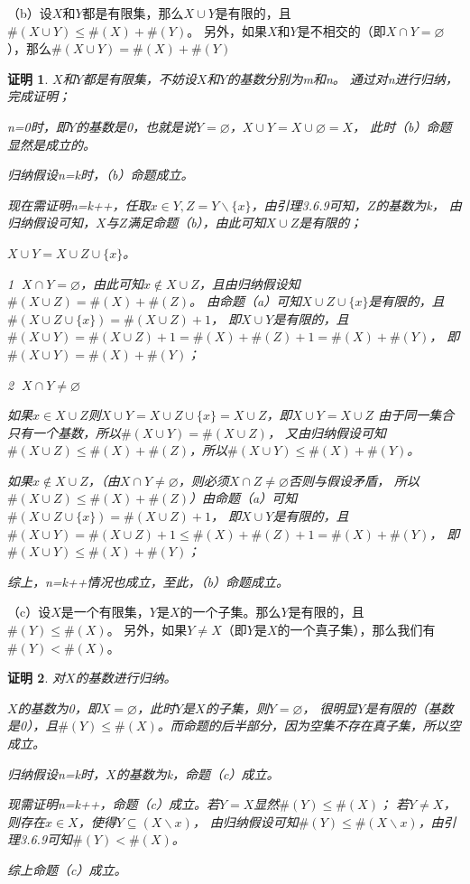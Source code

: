 \documentclass{article}
\theoremstyle{mystyle}
\theoremstyle{zproofstyle}
\newtheorem*{zproof}{证明}
\begin{document}
（b）设$X$和$Y$都是有限集，那么$X \cup Y$是有限的，且$\# (X \cup Y) \leq \# (X) + \# (Y)$。
另外，如果$X$和$Y$是不相交的（即$X \cap Y = \varnothing$），那么$\# (X \cup Y) = \# (X) + \# (Y)$
\begin{zproof}
  $X$和$Y$都是有限集，不妨设$X$和$Y$的基数分别为m和n。
  通过对n进行归纳，完成证明；

  n=0时，即$Y$的基数是0，也就是说$Y = \varnothing$，$X \cup Y = X \cup \varnothing = X$，
  此时（b）命题显然是成立的。

  归纳假设n=k时，（b）命题成立。

  现在需证明n=k++，任取$x \in Y, Z=Y \backslash \{x\}$，由引理3.6.9可知，$Z$的基数为k，
  由归纳假设可知，$X$与$Z$满足命题（b），由此可知$X \cup Z$是有限的；

  $X \cup Y = X \cup Z \cup \{x\}$。

  \textcircled{1} $X \cap Y = \varnothing$，由此可知$x \not\in X \cup Z$，且由归纳假设知$\#(X \cup Z) = \#(X)+\#(Z)$。
  由命题（a）可知$X \cup Z \cup \{x\}$是有限的，且$\#(X \cup Z \cup \{x\})=\#(X \cup Z)+1$，
  即$X \cup Y$是有限的，且$\#(X \cup Y) = \#(X \cup Z)+1 = \#(X) + \#(Z) + 1 = \#(X) + \#(Y)$，
  即$\#(X \cup Y) = \#(X) + \#(Y)$；

  \textcircled{2} $X \cap Y \neq \varnothing$

  如果$x \in X \cup Z$则$X \cup Y=X \cup Z \cup \{x\}=X \cup Z$，即$X \cup Y=X \cup Z$
  由于同一集合只有一个基数，所以$\#(X \cup Y)=\#(X \cup Z)$，
  又由归纳假设可知 $\#(X \cup Z) \leq \#(X) + \#(Z)$，所以$\#(X \cup Y) \leq \#(X)+ \#(Y)$。

  如果$x \not\in X \cup Z$，（由$X \cap Y \neq \varnothing$，则必须$X \cap Z \neq \varnothing$否则与假设矛盾，
  所以$\#(X \cup Z) \leq \#(X) + \#(Z)$）由命题（a）可知$\#(X \cup Z \cup \{x\})=\#(X \cup Z)+1$，
  即$X \cup Y$是有限的，且$\#(X \cup Y) = \#(X \cup Z)+1 \leq \#(X) + \#(Z) + 1 = \#(X) + \#(Y)$，
  即$\#(X \cup Y) \leq \#(X) + \#(Y)$；

  综上，n=k++情况也成立，至此，（b）命题成立。
\end{zproof}

（c）设$X$是一个有限集，$Y$是$X$的一个子集。那么$Y$是有限的，且$\# (Y) \leq \# (X)$。
另外，如果$Y \neq X$（即$Y$是$X$的一个真子集），那么我们有$\#(Y) < \#(X)$。

\begin{zproof}
  对$X$的基数进行归纳。

  $X$的基数为0，即$X = \varnothing$，此时$Y$是$X$的子集，则$Y = \varnothing$，
  很明显$Y$是有限的（基数是0），且$\# (Y) \leq \# (X)$。而命题的后半部分，因为空集不存在真子集，所以空成立。

  归纳假设n=k时，$X$的基数为k，命题（c）成立。

  现需证明n=k++，命题（c）成立。若$Y=X$显然$\#(Y) \leq \#(X)$；
  若$Y \neq X$，则存在$x \in X$，使得$Y \subseteq (X \backslash {x})$，
  由归纳假设可知$\#(Y) \leq \#(X \backslash x)$，由引理3.6.9可知$\#(Y) < \#(X)$。

  综上命题（c）成立。
\end{zproof}
\end{document}
